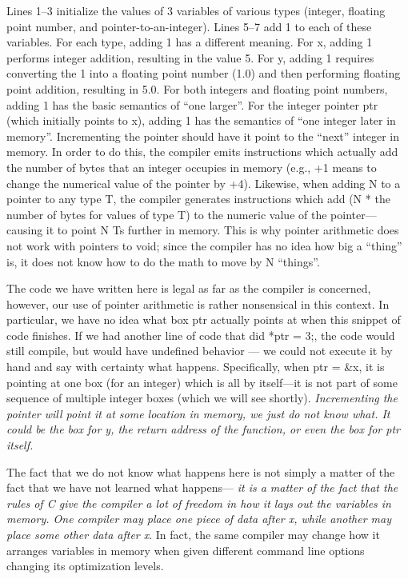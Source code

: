 \documentclass[11pt, a4paper]{article}
\begin{document}
Lines 1–3 initialize the values of 3 variables of various types (integer, floating point number, and pointer-to-an-integer). Lines 5–7 add 1 to each of these variables. For each type, adding 1 has a different meaning. For x, adding 1 performs integer addition, resulting in the value 5. For y, adding 1 requires converting the 1 into a floating point number (1.0) and then performing floating point addition, resulting in 5.0. For both integers and floating point numbers, adding 1 has the basic semantics of “one larger”. For the integer pointer ptr (which initially points to x), adding 1 has the semantics of “one integer later in memory”. Incrementing the pointer should have it point to the “next” integer in memory. In order to do this, the compiler emits instructions which actually add the number of bytes that an integer occupies in memory  (e.g., +1 means to change the numerical value of the pointer by +4). Likewise, when adding N to a pointer to any type T, the compiler generates instructions which add (N * the number of bytes for values of type T) to the numeric value of the pointer—causing it to point N Ts further in memory. This is why pointer arithmetic does not work with pointers to void; since the compiler has no idea how big a “thing” is, it does not know how to do the math to move by N “things”.

The code we have written here is legal as far as the compiler is concerned, however, our use of pointer arithmetic is rather nonsensical in this context. In particular, we have no idea what box ptr actually points at when this snippet of code finishes. If we had another line of code that did *ptr = 3;, the code would still compile, but would have undefined behavior — we could not execute it by hand and say with certainty what happens. Specifically, when ptr = \&x, it is pointing at one box (for an integer) which is all by itself—it is not part of some sequence of multiple integer boxes (which we will see shortly). \textit{Incrementing the pointer will point it at some location in memory, we just do not know what. It could be the box for y, the return address of the function, or even the box for ptr itself.}

The fact that we do not know what happens here is not simply a matter of the fact that we have not learned what happens— \textit{it is a matter of the fact that the rules of C give the compiler a lot of freedom in how it lays out the variables in memory. One compiler may place one piece of data after x, while another may place some other data after x}. In fact, the same compiler may change how it arranges variables in memory when given different command line options changing its optimization levels.
\end{document}
